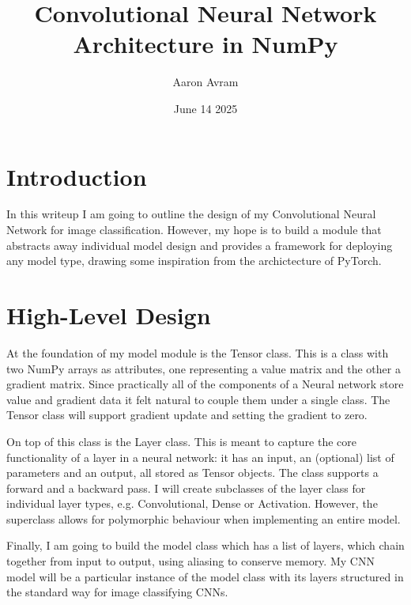 \documentclass[12pt]{article}
\title{Convolutional Neural Network Architecture in NumPy}
\author{Aaron Avram}
\date{June 14 2025}
\begin{document}
\maketitle

\section*{Introduction}
In this writeup I am going to outline the design of my Convolutional Neural Network for image classification.
However, my hope is to build a module that abstracts away individual model design and provides a framework
for deploying any model type, drawing some inspiration from the archictecture of PyTorch.

\section*{High-Level Design}
At the foundation of my model module is the Tensor class. This is a class with two NumPy arrays as attributes,
one representing a value matrix and the other a gradient matrix. Since practically all of the components of a Neural
network store value and gradient data it felt natural to couple them under a single class. The Tensor class will support
gradient update and setting the gradient to zero.


On top of this class is the Layer class. This is meant to capture the core functionality of a layer in a neural network:
it has an input, an (optional) list of parameters and an output, all stored as Tensor objects. The class supports a forward 
and a backward pass. I will create subclasses of the layer class for individual layer types, e.g.
Convolutional, Dense or Activation. However, the superclass allows for polymorphic 
behaviour when implementing an entire model.


Finally, I am going to build the model class which has a list of layers, which chain together from input to output, using
aliasing to conserve memory. My CNN model will be a particular instance of the model class with its layers structured
in the standard way for image classifying CNNs.
\end{document}
